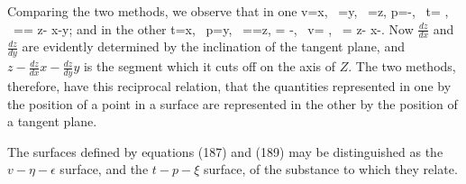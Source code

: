\documentclass[12pt]{article}
\begin{document}
Comparing the two methods, we observe that in one
\eqs v=x, \ \eta=y, \ \epsilon=z,   \label{187}\eqe
\eqs p=-, \ t= , \ \mu=\xi= z- x-y;  \label{188}\eqe
and in the other
\eqs  t=x, \ p=y, \ \mu =\xi=z,  \label{189}\eqe
\eqs \eta = -, \ v= , \ \epsilon= z- x-.  \label{190}\eqe
Now $\frac{d z}{d x}$ and $\frac{d z}{d y}$ are evidently determined by the inclination of the tangent plane, and $z- \frac{d   z}{d   x}x-\frac{d   z}{d   y}y$ is the segment which it cuts off on the axis of $Z$. The two methods, therefore, have this reciprocal relation, that the quantities represented in one by the position of a point in a surface are represented in the other by the position of a tangent plane.


The surfaces defined by equations (187) and (189) may be distinguished as the $v\!-\eta\!-\epsilon$ surface, and the $t\!-p\!-\xi$ surface, of the substance to which they relate.
\end{document}
